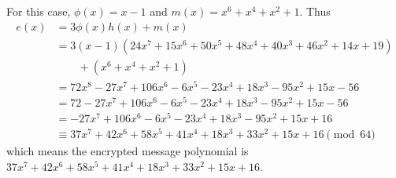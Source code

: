 \begin{questions}
    \item For this case, $\phi(x) = x - 1$ and $m(x) = x^6 + x^4 + x^2 + 1$. Thus
    \begin{align*}
        e(x) &= 3\phi(x)h(x) + m(x) \\
        &= 3(x-1)(24x^7 + 15x^6 + 50x^5 + 48x^4 + 40x^3 + 46x^2 + 14x + 19)\\
        &\quad\quad + (x^6 + x^4 + x^2 + 1)\\
        &= 72x^8 - 27x^7 + 106x^6 - 6x^5 - 23x^4 + 18x^3 - 95x^2 + 15x - 56\\
        &= 72 - 27x^7 + 106x^6 - 6x^5 - 23x^4 + 18x^3 - 95x^2 + 15x - 56\\
        &= -27x^7 + 106x^6 - 6x^5 - 23x^4 + 18x^3 - 95x^2 + 15x + 16\\
        &\equiv 37x^7 + 42x^6 + 58x^5 + 41x^4 + 18x^3 + 33x^2 + 15x + 16 \pmod{64}
    \end{align*}
    which means the encrypted message polynomial is $37x^7 + 42x^6 + 58x^5 + 41x^4 + 18x^3 + 33x^2 + 15x + 16$.
\end{questions}
